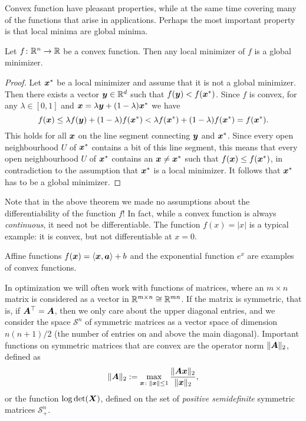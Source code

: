 Convex function have pleasant properties, while at the same time covering many of the functions that arise in applications. Perhaps the most important property is that local minima are global minima.

\begin{theorem}
 Let $f\colon \mathbb{R}^n\to \mathbb{R}$ be a convex function. Then any local minimizer of $f$ is a global minimizer.
\end{theorem}

\begin{proof}
 Let $\bm{x}^*$ be a local minimizer and assume that it is not a global minimizer. Then there exists a vector $\bm{y}\in \mathbb{R}^d$ such that $f(\bm{y})<f(\bm{x}^*)$. Since $f$ is convex, for any $\lambda\in [0,1]$ and $\bm{x}=\lambda \bm{y}+(1-\lambda)\bm{x}^*$ we have
 \begin{equation*}
  f(\bm{x}) \leq \lambda f(\bm{y})+(1-\lambda) f(\bm{x}^*) < \lambda f(\bm{x}^*)+(1-\lambda)f(\bm{x}^*) = f(\bm{x}^*).
 \end{equation*}
This holds for all $\bm{x}$ on the line segment connecting $\bm{y}$ and $\bm{x}^*$. Since every open neighbourhood $U$ of $\bm{x}^*$ contains a bit of this line segment, this means that every open neighbourhood $U$ of $\bm{x}^*$ contains an $\bm{x}\neq \bm{x}^*$ such that $f(\bm{x})\leq f(\bm{x}^*)$, in contradiction to the assumption that $\bm{x}^*$ is a local minimizer. It follows that $\bm{x}^*$ has to be a global minimizer.
\end{proof}

\begin{remark} Note that in the above theorem we made no assumptions about the differentiability of the function $f$! In fact, while a convex function is always {\em continuous}, it need not be differentiable. The function $f(x) = |x|$ is a typical example: it is convex, but not differentiable at $x=0$.
\end{remark}

\begin{example}
 Affine functions $f(\bm{x})=\langle {\bm{x}}, {\bm{a}} \rangle+b$ and the exponential function $e^x$ are examples of convex functions. 
\end{example}

\begin{example}
 In optimization we will often work with functions of matrices, where an $m\times n$ matrix is considered as a vector in $\mathbb{R}^{m\times n}\cong \mathbb{R}^{mn}$. If the matrix is symmetric, that is, if $\bm{A}^{\top}=\bm{A}$, then we only care about the upper diagonal entries, and we consider the space $\mathcal{S}^n$ of symmetric matrices as a vector space of dimension $n(n+1)/2$ (the number of entries on and above the main diagonal). Important functions on symmetric matrices that are convex are the operator norm $\Vert {\bm{A}}\Vert_2$, defined as
 \begin{equation*}
  \Vert {\bm{A}}\Vert_2 := \max_{\bm{x}\colon \Vert {\bm{x}}\Vert\leq 1} \frac{\Vert {\bm{A}\bm{x}}\Vert_2}{\Vert {\bm{x}}\Vert_2},
 \end{equation*}
or the function $\log \det(\bm{X})$, defined on the set of {\em positive semidefinite} symmetric matrices $\mathcal{S}_+^n$.
\end{example}

